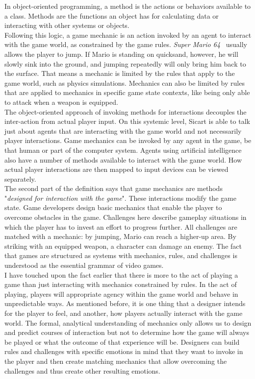 In object-oriented programming, a method is the actions or behaviors available to a class. Methods are the functions an object has for calculating data or interacting with other systems or objects.~\cite{Weisfeld2008}\\
Following this logic, a game mechanic is an action invoked by an agent to interact with the game world, as constrained by the game rules. \textit{Super Mario 64}~\cite{mario64} usually allows the player to jump. If Mario is standing on quicksand, however, he will slowly sink into the ground, and jumping repeatedly will only bring him back to the surface. That means a mechanic is limited by the rules that apply to the game world, such as physics simulations. Mechanics can also be limited by rules that are applied to mechanics in specific game state contexts, like being only able to attack when a weapon is equipped.\\
The object-oriented approach of invoking methods for interactions decouples the inter-action from actual player input. On this systemic level, Sicart is able to talk just about agents that are interacting with the game world and not necessarily player interactions. Game mechanics can be invoked by any agent in the game, be that human or part of the computer system. Agents using artificial intelligence also have a number of methods available to interact with the game world. How actual player interactions are then mapped to input devices can be viewed separately.\\
The second part of the definition says that game mechanics are methods "\textit{designed for interaction with the game}". These interactions modify the game state. Game developers design basic mechanics that enable the player to overcome obstacles in the game. Challenges here describe gameplay situations in which the player has to invest an effort to progress further. All challenges are matched with a mechanic: by jumping, Mario can reach a higher-up area. By striking with an equipped weapon, a character can damage an enemy. The fact that games are structured as systems with mechanics, rules, and challenges is understood as the essential grammar of video games.~\cite{Sicart2008}\\
I have touched upon the fact earlier that there is more to the act of playing a game than just interacting with mechanics constrained by rules. In the act of playing, players will appropriate agency within the game world and behave in unpredictable ways. As mentioned before, it is one thing that a designer intends for the player to feel, and another, how players actually interact with the game world. The formal, analytical understanding of mechanics only allows us to design and predict courses of interaction but not to determine how the game will always be played or what the outcome of that experience will be. Designers can build rules and challenges with specific emotions in mind that they want to invoke in the player and then create matching mechanics that allow overcoming the challenges and thus create other resulting emotions.\\
